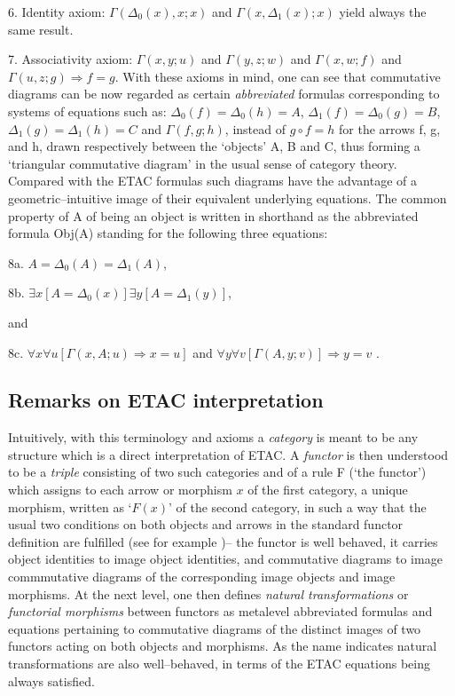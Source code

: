 \documentclass[12pt]{article}
\theoremstyle{plain}
\theoremstyle{definition}
\numberwithin{equation}{section}
\begin{document}
6. Identity axiom:
$ \Gamma(\Delta_0 (x), x;x)$ and  $ \Gamma(x, \Delta_1 (x);x)$  yield always the same result.

7. Associativity axiom: $\Gamma(x,y;u)$ and $\Gamma(y,z;w)$ and $\Gamma(x,w;f)$ and $\Gamma(u,z;g)\Rightarrow f = g $.
With these axioms in mind, one can see that commutative diagrams can be now regarded as certain 
\textit{abbreviated} formulas corresponding to systems of equations such as:  
$\Delta_0(f) = \Delta_0(h) = A$, $\Delta_1(f) = \Delta_0(g) = B$, $\Delta_1(g) = \Delta_1(h) = C$ 
and $\Gamma(f,g;h)$, instead of $g\circ f = h$ for the arrows f, g, and h, drawn respectively between the 
`objects' A, B and C, thus forming a `triangular commutative diagram' in the usual sense of category theory. Compared with the ETAC formulas such diagrams have the advantage of a geometric--intuitive image of their equivalent underlying equations. The common property of A of being an object is written in shorthand as the abbreviated formula Obj(A) standing for the following three equations:

8a. $A = \Delta_0(A) = \Delta_1(A)$,

8b. $ \exists x[A = \Delta_0 (x)] \exists y[A = \Delta_1 (y)]$,

and 

8c. $\forall x \forall u [\Gamma (x,A; u)\Rightarrow x = u]$ and 
$ \forall y  \forall v [\Gamma (A,y; v)] \Rightarrow y = v$ .  

\subsection{Remarks on ETAC interpretation}

  Intuitively, with this terminology and axioms a \textit{category} is meant to be any structure which is a direct interpretation of ETAC. A \textit{functor} is then  understood to be a \textit{triple} consisting of two such categories and of a rule F (`the functor') which assigns to each arrow or morphism $x$ of the first category,
a unique morphism, written as `$F(x)$' of the second category, in such a way that the usual two conditions on both objects and arrows in the standard functor definition are fulfilled (see for example \cite {ICBM})--  the functor is well behaved, it carries object identities to image object identities, and commutative diagrams to image commmutative diagrams of the corresponding image objects and image morphisms.  At the next level, one then defines \emph{natural transformations} or \emph{functorial morphisms} between functors as metalevel abbreviated formulas and equations pertaining to commutative diagrams of the distinct images of two functors acting on both objects and morphisms. As the name indicates natural transformations are also well--behaved, in terms of the ETAC equations being always satisfied. 
\end{document}
